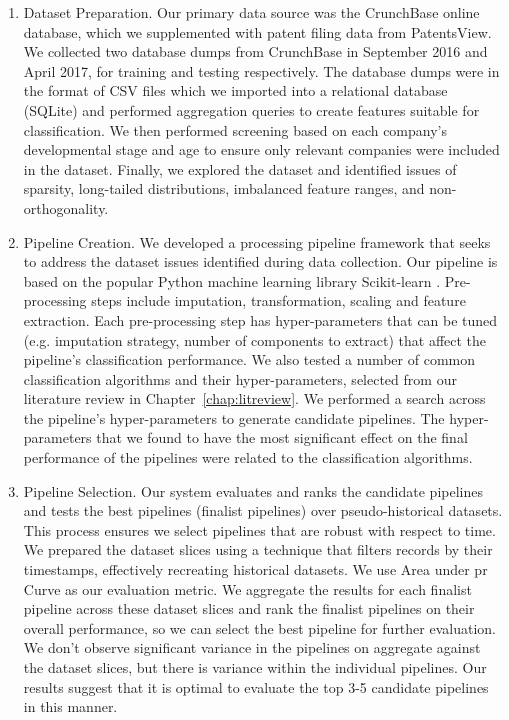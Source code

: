 \documentclass[../thesis/thesis.tex]{subfiles}
\begin{document}
\begin{enumerate}

\item Dataset Preparation. Our primary data source was the CrunchBase online database, which we supplemented with patent filing data from PatentsView. We collected two database dumps from CrunchBase in September 2016 and April 2017, for training and testing respectively. The database dumps were in the format of CSV files which we imported into a relational database (SQLite) and performed aggregation queries to create features suitable for classification. We then performed screening based on each company's developmental stage and age to ensure only relevant companies were included in the dataset. Finally, we explored the dataset and identified issues of sparsity, long-tailed distributions, imbalanced feature ranges, and non-orthogonality.

\item Pipeline Creation. We developed a processing pipeline framework that seeks to address the dataset issues identified during data collection. Our pipeline is based on the popular Python machine learning library Scikit-learn \cite{pedregosa2011}. Pre-processing steps include imputation, transformation, scaling and feature extraction. Each pre-processing step has hyper-parameters that can be tuned (e.g. imputation strategy, number of components to extract) that affect the pipeline's classification performance. We also tested a number of common classification algorithms and their hyper-parameters, selected from our literature review in Chapter~\ref{chap:litreview}. We performed a search across the pipeline's hyper-parameters to generate candidate pipelines. The hyper-parameters that we found to have the most significant effect on the final performance of the pipelines were related to the classification algorithms.

\item Pipeline Selection. Our system evaluates and ranks the candidate pipelines and tests the best pipelines (finalist pipelines) over pseudo-historical datasets. This process ensures we select pipelines that are robust with respect to time. We prepared the dataset slices using a technique that filters records by their timestamps, effectively recreating historical datasets. We use Area under \gls{pr} Curve as our evaluation metric. We aggregate the results for each finalist pipeline across these dataset slices and rank the finalist pipelines on their overall performance, so we can select the best pipeline for further evaluation. We don't observe significant variance in the pipelines on aggregate against the dataset slices, but there is variance within the individual pipelines. Our results suggest that it is optimal to evaluate the top 3-5 candidate pipelines in this manner.


\end{enumerate}
\end{document}
